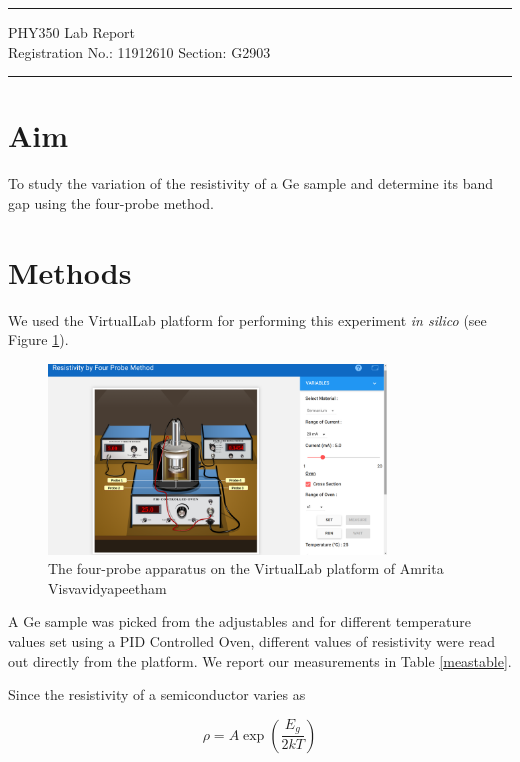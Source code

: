 \documentclass{article}
\begin{document}
	
	\author{Aayush Arya}
	\date{(Submitted: \today)}
	\title{}
	
	\maketitle
	
	\hrule
	\begin{center}
		PHY350 Lab Report\\
		Registration No.: 11912610 \quad Section: G2903
	\end{center}
	\hrule
	
	\section*{Aim}
	To study the variation of the resistivity of a Ge sample and determine its band gap using the four-probe method.

	\section*{Methods}
	We used the VirtualLab platform for performing this experiment {\it in silico} (see Figure \ref{fig:sim}).
	
	\begin{figure}[h]
		\centering
		\includegraphics[width=0.8\textwidth]{four_probe_app}
		\caption{The four-probe apparatus on the VirtualLab platform of Amrita Visvavidyapeetham}
		\label{fig:sim}	
	\end{figure}

	 A Ge sample was picked from the adjustables and for different temperature values set using a PID Controlled Oven, different values of resistivity were read out directly from the platform. We report our measurements in Table \ref{meastable}.
	 
	 Since the resistivity of a semiconductor varies as
	 
	 $$ \rho = A \exp{ \left( \frac{E_g}{2kT} \right) }$$
	 
\end{document}
